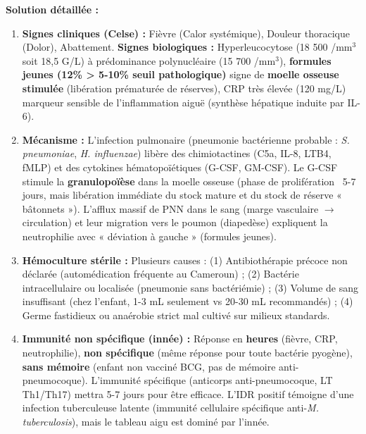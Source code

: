 \documentclass[11pt]{article}
\newcounter{popsec}
\newcounter{popsub}
\newcommand{\courssub}[1]{%
  \stepcounter{popsub}%
  \par\vspace{9pt}\noindent{\popxbold\fontsize{11.5}{13}\selectfont\color{popink}{\color{poporange}\thepopsec.\thepopsub}\hspace{6pt}#1}\par\nopagebreak\vspace{4pt}
}
\begin{document}
\begin{exoresolu}
\tcblower
\textbf{Solution détaillée :}
\begin{enumerate}
\item \textbf{Signes cliniques (Celse) :} Fièvre (Calor systémique), Douleur thoracique (Dolor), Abattement. \textbf{Signes biologiques :} Hyperleucocytose (18 500 /mm$^3$ soit 18,5 G/L) à prédominance polynucléaire (15 700 /mm$^3$), \textbf{formules jeunes (12\% > 5-10\% seuil pathologique)} signe de \textbf{moelle osseuse stimulée} (libération prématurée de réserves), CRP très élevée (120 mg/L) marqueur sensible de l'inflammation aiguë (synthèse hépatique induite par IL-6).
\item \textbf{Mécanisme :} L'infection pulmonaire (pneumonie bactérienne probable : \emph{S. pneumoniae}, \emph{H. influenzae}) libère des chimiotactines (C5a, IL-8, LTB4, fMLP) et des cytokines hématopoïétiques (G-CSF, GM-CSF). Le G-CSF stimule la \textbf{granulopoïèse} dans la moelle osseuse (phase de prolifération ~5-7 jours, mais libération immédiate du stock mature et du stock de réserve « bâtonnets »). L'afflux massif de PNN dans le sang (marge vasculaire $\rightarrow$ circulation) et leur migration vers le poumon (diapedèse) expliquent la neutrophilie avec « déviation à gauche » (formules jeunes).
\item \textbf{Hémoculture stérile :} Plusieurs causes : (1) Antibiothérapie précoce non déclarée (automédication fréquente au Cameroun) ; (2) Bactérie intracellulaire ou localisée (pneumonie sans bactériémie) ; (3) Volume de sang insuffisant (chez l'enfant, 1-3 mL seulement vs 20-30 mL recommandés) ; (4) Germe fastidieux ou anaérobie strict mal cultivé sur milieux standards.
\item \textbf{Immunité non spécifique (innée) :} Réponse en \textbf{heures} (fièvre, CRP, neutrophilie), \textbf{non spécifique} (même réponse pour toute bactérie pyogène), \textbf{sans mémoire} (enfant non vacciné BCG, pas de mémoire anti-pneumocoque). L'immunité spécifique (anticorps anti-pneumocoque, LT Th1/Th17) mettra 5-7 jours pour être efficace. L'IDR positif témoigne d'une infection tuberculeuse latente (immunité cellulaire spécifique anti-\emph{M. tuberculosis}), mais le tableau aigu est dominé par l'innée.
\end{enumerate}
\end{exoresolu}

\courssub{Synthèse et ouverture}
\end{document}
